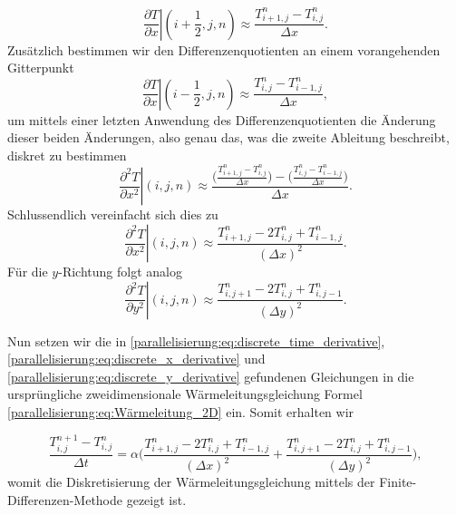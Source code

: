 \begin{equation}
	\left. \frac{\partial T}{\partial x} \right|{(i+\frac{1}{2},j,n)}
	\approx \frac{T_{i+1,j}^n - T_{i,j}^n}{\Delta x}.
\end{equation}
Zusätzlich bestimmen wir den Differenzenquotienten an einem vorangehenden Gitterpunkt
\begin{equation}
	\left. \frac{\partial T}{\partial x} \right|{(i-\frac{1}{2},j,n)}
	\approx \frac{T_{i,j}^n - T_{i-1,j}^n}{\Delta x},
\end{equation}
um mittels einer letzten Anwendung des Differenzenquotienten die Änderung dieser beiden Änderungen, also genau das, was die zweite Ableitung beschreibt, diskret zu bestimmen
\begin{equation}
	\displaystyle
	\left. \frac{\partial^2 T}{\partial x^2} \right|{(i,j,n)}
	\approx
	\frac{
		\biggl( \frac{T_{i+1,j}^n - T_{i,j}^n}{\Delta x} \biggr)
		- \biggl( \frac{T_{i,j}^n - T_{i-1,j}^n}{\Delta x} \biggr)
	}{\Delta x}.
\end{equation}
Schlussendlich vereinfacht sich dies zu 
\begin{equation}
	\label{parallelisierung:eq:discrete_x_derivative}
	\left. \frac{\partial^2 T}{\partial x^2} \right|{(i,j,n)} \approx \frac{T_{i+1,j}^n - 2T_{i,j}^n + T_{i-1,j}^n}{(\Delta x)^2}.
\end{equation}
Für die $y$-Richtung folgt analog
\begin{equation}
	\label{parallelisierung:eq:discrete_y_derivative}
	\left. \frac{\partial^2 T}{\partial y^2} \right|{(i,j,n)} \approx \frac{T_{i,j+1}^n - 2T_{i,j}^n + T_{i,j-1}^n}{(\Delta y)^2}.
\end{equation}

Nun setzen wir die in \eqref{parallelisierung:eq:discrete_time_derivative},  \eqref{parallelisierung:eq:discrete_x_derivative} und \eqref{parallelisierung:eq:discrete_y_derivative} gefundenen Gleichungen in die ursprüngliche zweidimensionale Wärmeleitungsgleichung Formel \eqref{parallelisierung:eq:Wärmeleitung_2D} ein.
Somit erhalten wir 

\begin{equation}
	\label{parallelisierung:eq:update_formula_unsorted}
	\frac{T_{i,j}^{n+1} - T_{i,j}^n}{\Delta t}
	=
	\alpha \biggl(
	\frac{T_{i+1,j}^n - 2 T_{i,j}^n + T_{i-1,j}^n}{(\Delta x)^2}
	+
	\frac{T_{i,j+1}^n - 2 T_{i,j}^n + T_{i,j-1}^n}{(\Delta y)^2}
	\biggr),
\end{equation}
womit die Diskretisierung der Wärmeleitungsgleichung mittels der Finite-Differenzen-Methode gezeigt ist.

